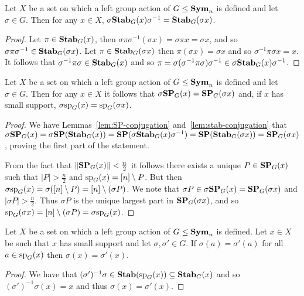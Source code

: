 \documentclass[../main/thesis.tex]{subfiles}
\begin{document}
\begin{lem}
  \label{lem:stab-conjugation}
  Let $X$ be a set on which a left group action of $G \leq \text{\textbf{Sym}}_n$ is defined
  and let $\sigma \in G$. Then for any $x \in X$, $\sigma \text{\textbf{Stab}}_G (x)
  \sigma^{-1} = \text{\textbf{Stab}}_G(\sigma x)$.
\end{lem}

\begin{proof}
  Let $\pi \in \text{\textbf{Stab}}_G(x)$, then $\sigma \pi \sigma^{-1}(\sigma x) = \sigma \pi
  x = \sigma x$, and so $\sigma \pi \sigma^{-1} \in \text{\textbf{Stab}}_G(\sigma x)$. Let $\pi
  \in \text{\textbf{Stab}}_G(\sigma x)$ then $\pi (\sigma x) = \sigma x$ and so $\sigma^{-1}
  \pi \sigma x = x$. It follows that $\sigma^{-1} \pi \sigma \in \text{\textbf{Stab}}_G(x)$ and
  so $\pi = \sigma (\sigma^{-1} \pi \sigma) \sigma ^{-1} \in \sigma \text{\textbf{Stab}}_G(x)
  \sigma^{-1}$.
\end{proof}

\begin{lem}
  \label{lem:support-mapping}
  Let $X$ be a set on which a left group action of $G \leq \text{\textbf{Sym}}_n$ is defined
  and let $\sigma \in G$. Then for any $x \in X$ it follows that $\sigma \text{\textbf{SP}}_G
  (x) = \text{\textbf{SP}}_G (\sigma x)$ and, if $x$ has small support, $\sigma \text{sp}_G (x) =
  \text{sp}_G (\sigma x)$.
\end{lem}
\begin{proof}
  We have Lemmas~\ref{lem:SP-conjugation} and~\ref{lem:stab-conjugation} that
  $\sigma \text{\textbf{SP}}_G (x) = \sigma \text{\textbf{SP}}(\text{\textbf{Stab}}_G (x)) = \text{\textbf{SP}}(\sigma \text{\textbf{Stab}}_G(x)
  \sigma^{-1}) = \text{\textbf{SP}} (\text{\textbf{Stab}}_G(\sigma x)) = \text{\textbf{SP}}_G (\sigma x)$, proving the first
  part of the statement.

  From the fact that $\| \text{\textbf{SP}}_G(x) \| < \frac{n}{2}$ it follows there exists a
  unique $P \in \text{\textbf{SP}}_G(x)$ such that $\vert P \vert > \frac{n}{2}$ and
  $\text{sp}_G(x) = [n] \setminus P$. But then $\sigma \text{sp}_G (x) = \sigma([n]
  \setminus P) = [n] \setminus (\sigma P)$. We note that $\sigma P \in \sigma
  \text{\textbf{SP}}_G (x) = \text{\textbf{SP}}_G(\sigma x)$ and $\vert \sigma P \vert > \frac{n}{2}$. Thus
  $\sigma P$ is the unique largest part in $\text{\textbf{SP}}_G(\sigma x)$, and so
  $\text{sp}_G(\sigma x) = [n] \setminus (\sigma P) = \sigma \text{sp}_G(x)$.
\end{proof}

\begin{lem}
  Let $X$ be a set on which a left group action of $G \leq \text{\textbf{Sym}}_n$ is defined.
  Let $x \in X$ be such that $x$ has small support and let $\sigma, \sigma' \in
  G$. If $\sigma (a) = \sigma' (a)$ for all $a \in \text{sp}_G(x)$ then $\sigma (x)
  = \sigma'(x)$.
  \label{lem:support-determine-action}
\end{lem}
\begin{proof}
  We have that $(\sigma')^{-1}\sigma \in \text{\textbf{Stab}}(\text{sp}_G(x)) \subseteq
  \text{\textbf{Stab}}_G(x)$ and so $(\sigma')^{-1} \sigma (x) = x$ and thus $\sigma (x) =
  \sigma' (x)$.
\end{proof}
\end{document}
